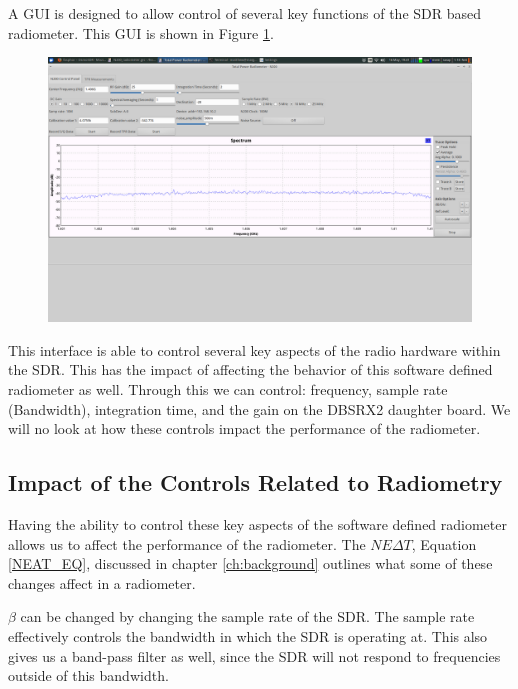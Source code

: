 A GUI is designed to allow control of several key functions of the SDR based radiometer.  This GUI is shown in Figure \ref{radiometer_gui}. 

{\begin{figure}[h!tb] 
\centering
\includegraphics[width=17cm]{Images/radiometer_gui.png}
\label{radiometer_gui}
\end{figure}
}

This interface is able to control several key aspects of the radio hardware within the SDR.  This has the impact of affecting the behavior of this software defined radiometer as well.  Through this we can control: frequency, sample rate (Bandwidth), integration time, and the gain on the DBSRX2 daughter board.  We will no look at how these controls impact the performance of the radiometer.  

\subsection{Impact of the Controls Related to Radiometry}

Having the ability to control these key aspects of the software defined radiometer allows us to affect the performance of the radiometer.  The $NE\Delta T$, Equation \ref{NEAT_EQ}, discussed in chapter \ref{ch:background} outlines what some of these changes affect in a radiometer.

$\beta$ can be changed by changing the sample rate of the SDR.  The sample rate effectively controls the bandwidth in which the SDR is operating at.  This also gives us a band-pass filter as well, since the SDR will not respond to frequencies outside of this bandwidth.  

